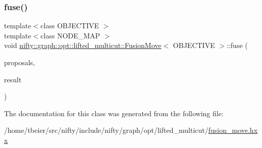 \mbox{\label{classnifty_1_1graph_1_1opt_1_1lifted__multicut_1_1FusionMove_ad02136d55b94cab57454ec413b3db4cf}} 
\subsubsection{\texorpdfstring{fuse()}{fuse()}\hspace{0.1cm}{\footnotesize\ttfamily [2/2]}}
{\footnotesize\ttfamily template$<$class O\+B\+J\+E\+C\+T\+I\+VE $>$ \\
template$<$class N\+O\+D\+E\+\_\+\+M\+AP $>$ \\
void \hyperlink{classnifty_1_1graph_1_1opt_1_1lifted__multicut_1_1FusionMove}{nifty\+::graph\+::opt\+::lifted\+\_\+multicut\+::\+Fusion\+Move}$<$ O\+B\+J\+E\+C\+T\+I\+VE $>$\+::fuse (\begin{DoxyParamCaption}\item[{const std\+::vector$<$ const N\+O\+D\+E\+\_\+\+M\+AP $\ast$$>$ \&}]{proposals,  }\item[{N\+O\+D\+E\+\_\+\+M\+AP $\ast$}]{result }\end{DoxyParamCaption})\hspace{0.3cm}{\ttfamily [inline]}}



The documentation for this class was generated from the following file\+:\begin{DoxyCompactItemize}
\item 
/home/tbeier/src/nifty/include/nifty/graph/opt/lifted\+\_\+multicut/\hyperlink{lifted__multicut_2fusion__move_8hxx}{fusion\+\_\+move.\+hxx}\end{DoxyCompactItemize}
